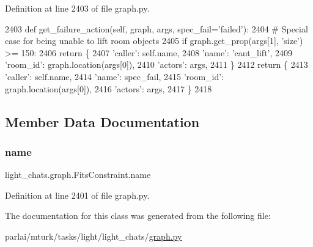 Definition at line 2403 of file graph.\+py.


\begin{DoxyCode}
2403     \textcolor{keyword}{def }get\_failure\_action(self, graph, args, spec\_fail='failed'):
2404         \textcolor{comment}{# Special case for being unable to lift room objects}
2405         \textcolor{keywordflow}{if} graph.get\_prop(args[1], \textcolor{stringliteral}{'size'}) >= 150:
2406             \textcolor{keywordflow}{return} \{
2407                 \textcolor{stringliteral}{'caller'}: self.name,
2408                 \textcolor{stringliteral}{'name'}: \textcolor{stringliteral}{'cant\_lift'},
2409                 \textcolor{stringliteral}{'room\_id'}: graph.location(args[0]),
2410                 \textcolor{stringliteral}{'actors'}: args,
2411             \}
2412         \textcolor{keywordflow}{return} \{
2413             \textcolor{stringliteral}{'caller'}: self.name,
2414             \textcolor{stringliteral}{'name'}: spec\_fail,
2415             \textcolor{stringliteral}{'room\_id'}: graph.location(args[0]),
2416             \textcolor{stringliteral}{'actors'}: args,
2417         \}
2418 
\end{DoxyCode}


\subsection{Member Data Documentation}
\mbox{\label{classlight__chats_1_1graph_1_1FitsConstraint_a7de858979fc9366f1099b157151991b5}} 
\subsubsection{\texorpdfstring{name}{name}}
{\footnotesize\ttfamily light\+\_\+chats.\+graph.\+Fits\+Constraint.\+name\hspace{0.3cm}{\ttfamily [static]}}



Definition at line 2401 of file graph.\+py.



The documentation for this class was generated from the following file\+:\begin{DoxyCompactItemize}
\item 
parlai/mturk/tasks/light/light\+\_\+chats/\hyperlink{parlai_2mturk_2tasks_2light_2light__chats_2graph_8py}{graph.\+py}\end{DoxyCompactItemize}

